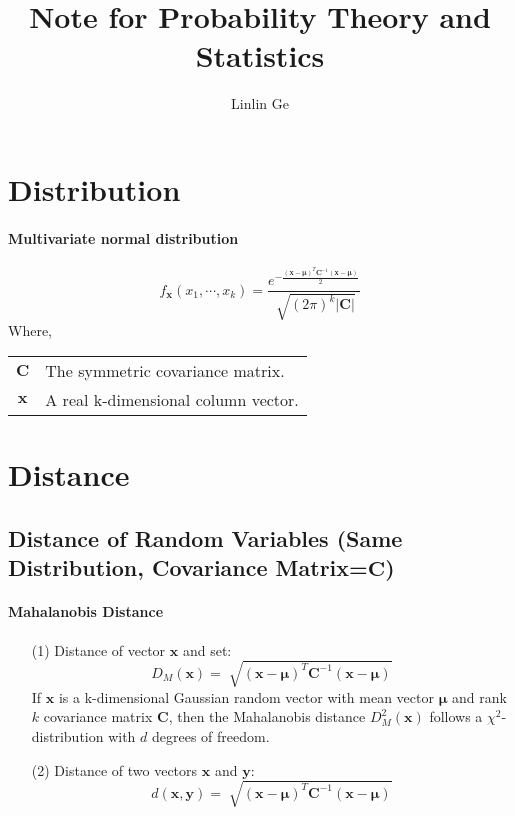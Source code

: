 \documentclass[10pt]{article}
\title{Note for Probability Theory and Statistics}
\author{Linlin Ge}
\begin{document}
\maketitle

\section{Distribution}
\paragraph{Multivariate normal distribution} \mbox{}
$$  f_{\bm{x}}(x_1,\cdots,x_k)=\frac{ e^{-\frac{\displaystyle (\bm{x} -\bm{\mu})^T \bm{C}^{-1}(\bm{x}-\bm{\mu})}{2}}}{\sqrt[]{(2 \pi)^k \vert \bm{C} \vert}}$$
Where, 
\begin{table}[H]
\begin{tabular}{cl}
$\bm{C}$ & The symmetric covariance matrix. \\
$\bm{x}$ & A real k-dimensional column vector.\\
\end{tabular}
\end{table}



\section{Distance}
\subsection{Distance of Random Variables (Same Distribution, Covariance Matrix=$\bm{C}$)}
\paragraph{Mahalanobis Distance} \mbox{}
\begin{itemize}
\item[(1)] Distance of vector $\bm{x}$ and set:
$$D_M(\bm{x})=\sqrt[]{(\bm{x}-\bm{\mu})^{T}\bm{C}^{-1}(\bm{x}-\bm{\mu})}$$
If $\bm{x}$ is a k-dimensional Gaussian random vector with mean vector $\bm{\mu}$ and rank $k$ covariance matrix $\bm{C}$, then the Mahalanobis distance $D^2_M(\bm{x})$ follows a $\chi^2$-distribution with $d$ degrees of freedom.

\item[(2)] Distance of two vectors $\bm{x}$ and $\bm{y}$:
$$d(\bm{x},\bm{y})=\sqrt[]{(\bm{x}-\bm{\mu})^{T}\bm{C}^{-1}(\bm{x}-\bm{\mu})}$$

\end{itemize}


\begin{thebibliography}{1}



\end{thebibliography}
\end{document}
